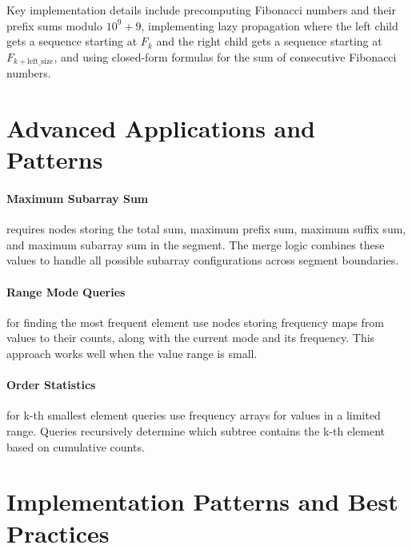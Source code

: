Key implementation details include precomputing Fibonacci numbers and their prefix sums modulo $10^9 + 9$, implementing lazy propagation where the left child gets a sequence starting at $F_k$ and the right child gets a sequence starting at $F_{k + \text{left\_size}}$, and using closed-form formulas for the sum of consecutive Fibonacci numbers.

\section{Advanced Applications and Patterns}

\paragraph{Maximum Subarray Sum} requires nodes storing the total sum, maximum prefix sum, maximum suffix sum, and maximum subarray sum in the segment. The merge logic combines these values to handle all possible subarray configurations across segment boundaries.


\paragraph{Range Mode Queries} for finding the most frequent element use nodes storing frequency maps from values to their counts, along with the current mode and its frequency. This approach works well when the value range is small.

\paragraph{Order Statistics} for k-th smallest element queries use frequency arrays for values in a limited range. Queries recursively determine which subtree contains the k-th element based on cumulative counts.

\section{Implementation Patterns and Best Practices}

